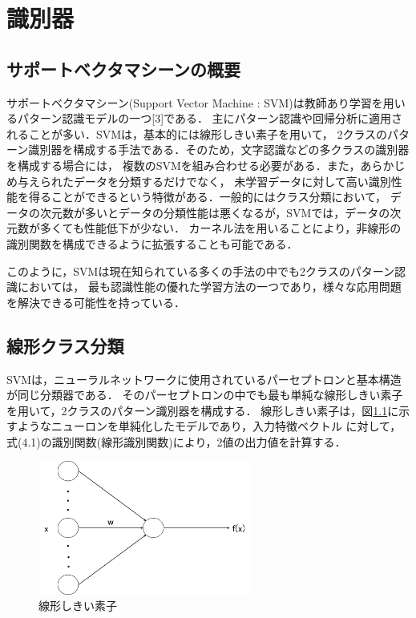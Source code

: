 \chapter{識別器}\label{abst}

\section{サポートベクタマシーンの概要}
サポートベクタマシーン(Support Vector Machine : SVM)は教師あり学習を用いるパターン認識モデルの一つ[3]である．
主にパターン認識や回帰分析に適用されることが多い．SVMは，基本的には線形しきい素子を用いて，
2クラスのパターン識別器を構成する手法である．そのため，文字認識などの多クラスの識別器を構成する場合には，
複数のSVMを組み合わせる必要がある．また，あらかじめ与えられたデータを分類するだけでなく，
未学習データに対して高い識別性能を得ることができるという特徴がある．一般的にはクラス分類において，
データの次元数が多いとデータの分類性能は悪くなるが，SVMでは，データの次元数が多くても性能低下が少ない．
カーネル法を用いることにより，非線形の識別関数を構成できるように拡張することも可能である．

このように，SVMは現在知られている多くの手法の中でも2クラスのパターン認識においては，
最も認識性能の優れた学習方法の一つであり，様々な応用問題を解決できる可能性を持っている．

\section{線形クラス分類}
SVMは，ニューラルネットワークに使用されているパーセプトロンと基本構造が同じ分類器である．
そのパーセプトロンの中でも最も単純な線形しきい素子を用いて，2クラスのパターン識別器を構成する．
線形しきい素子は，図\ref{fig:senkeisoshi}に示すようなニューロンを単純化したモデルであり，入力特徴ベクトル に対して，
式(4.1)の識別関数(線形識別関数)により，2値の出力値を計算する．

\newpage

\begin{figure}[htbp]
  \begin{center}
    \includegraphics[clip,width=7.0cm]{./images/senkeisoshi.png}
    \caption{線形しきい素子}
    \label{fig:senkeisoshi}
  \end{center}
\end{figure}

